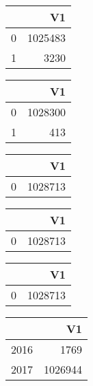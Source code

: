 \bigskip\bigskip
\centering
\begin{tabular}{rr}
  \hline
 & V1 \\ 
  \hline
0 & 1025483 \\ 
  1 & 3230 \\ 
   \hline
\end{tabular}

\bigskip\bigskip
\centering
\begin{tabular}{rr}
  \hline
 & V1 \\ 
  \hline
0 & 1028300 \\ 
  1 & 413 \\ 
   \hline
\end{tabular}

\bigskip\bigskip
\centering
\begin{tabular}{rr}
  \hline
 & V1 \\ 
  \hline
0 & 1028713 \\ 
   \hline
\end{tabular}

\bigskip\bigskip
\centering
\begin{tabular}{rr}
  \hline
 & V1 \\ 
  \hline
0 & 1028713 \\ 
   \hline
\end{tabular}

\bigskip\bigskip
\centering
\begin{tabular}{rr}
  \hline
 & V1 \\ 
  \hline
0 & 1028713 \\ 
   \hline
\end{tabular}

\bigskip\bigskip
\centering
\begin{tabular}{rr}
  \hline
 & V1 \\ 
  \hline
2016 & 1769 \\ 
  2017 & 1026944 \\ 
   \hline
\end{tabular}

